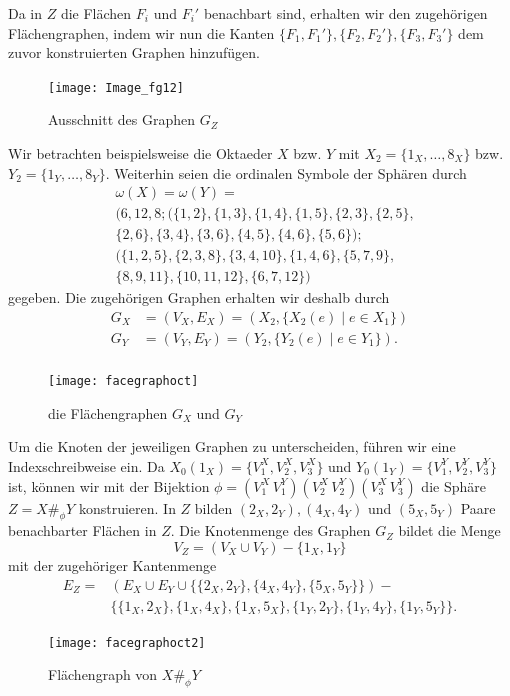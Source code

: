 \documentclass[12pt,titlepage,twoside,cleardoublepage]{article}
\theoremstyle{nummermitklammern}
\numberwithin{equation}{section}
\begin{document}
Da in $Z$ die Flächen $F_i$ und $F_i'$ benachbart sind, erhalten wir den zugehörigen Flächengraphen, indem wir nun die Kanten $\{F_1,F_1'\},\{F_2,F_2'\},\{F_3,F_3'\}$ dem zuvor konstruierten Graphen hinzufügen. 
\begin{figure}[H]
\begin{center}
\texttt{[image: Image\_fg12]}
\end{center}
\caption{Ausschnitt des Graphen $G_Z$}
\end{figure}
Wir betrachten beispielsweise die Oktaeder $X$ bzw. $Y$ mit $X_2=\{1_X,\ldots,8_X\}$ bzw. $Y_2=\{1_Y,\ldots,8_Y\}.$
Weiterhin seien die ordinalen Symbole der Sphären durch
\begin{align*}
&\omega(X)= \omega(Y)=\\
 &(6,12,8;(\{1,2\},\{1,3\},\{1,4\},\{1,5\},\{2,3\},\{2,5\},\\
 &\{2,6\},\{3,4\},\{3,6\},\{4,5\},\{4,6\},\{5,6\});\\
 &(\{1,2,5\},\{2,3,8\},\{3,4,10\},\{1,4,6\},\{5,7,9\},\\&\{8,9,11\},\{10,11,12\},\{6,7,12\})
 \end{align*}
 gegeben. Die zugehörigen Graphen erhalten wir deshalb durch 
\begin{align*}
G_X&=(V_X,E_X)=(X_2,\{X_2(e)\mid e\in X_1\})\\G_Y&=(V_Y,E_Y)=(Y_2,\{Y_2(e)\mid e\in Y_1\}).\\
\end{align*}
 \begin{figure}[H]
\begin{center}
\texttt{[image: facegraphoct]}
\end{center}
\caption{die Flächengraphen $G_X$ und $G_Y$}
\end{figure}   
Um die Knoten der jeweiligen Graphen zu unterscheiden, führen wir eine Indexschreibweise ein.
Da $X_0(1_X)=\{V^X_1,V^X_2,V^X_3\}$ und $Y_0(1_Y)=\{V^Y_1,V^Y_2,V^Y_3\}$ ist, können wir mit der Bijektion $\phi=(V^X_1\,V^Y_1)(V^X_2\,V_2^Y)(V_3^X\,V_3^Y)$ die Sphäre $Z=X\#_\phi Y$ konstruieren. In $Z$ bilden $(2_X,2_Y),(4_X,4_Y)$ und $(5_X,5_Y)$ Paare benachbarter Flächen in $Z.$
Die Knotenmenge des Graphen $G_Z$ bildet die Menge 
\[
V_Z=(V_X \cup V_Y)-\{1_X,1_Y\}
\]
mit der zugehöriger Kantenmenge 
\begin{align*}
E_Z=&(E_X \cup E_Y\cup \{\{2_X,2_Y\},\{4_X,4_Y\},\{5_X,5_Y\}\})-\\
&\{\{1_X,2_X\},\{1_X,4_X\},\{1_X,5_X\},\{1_Y,2_Y\},\{1_Y,4_Y\},\{1_Y,5_Y\}\}.
\end{align*}
\begin{figure}[H]
\begin{center}
\texttt{[image: facegraphoct2]}
\end{center}
\caption{Flächengraph von $X\#_{\phi} Y$}
\end{figure}   
\end{document}
